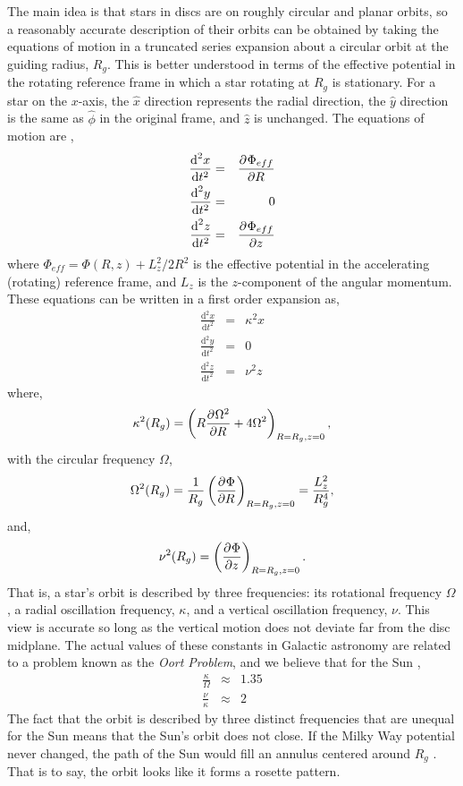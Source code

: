 The main idea is that stars in discs are on roughly circular and planar orbits, so a reasonably accurate description of their orbits can be obtained by taking the equations of motion in a truncated series expansion about a circular orbit at the guiding radius, $R_g$. This is better understood in terms of the effective potential in the rotating reference frame in which a star rotating at $R_g$ is stationary. For a star on the $x$-axis, the $\hat{x}$ direction represents the radial direction, the $\hat{y}$ direction is the same as $\hat{\phi}$ in the original frame, and $\hat{z}$ is unchanged. The equations of motion are \citep{BT},
\begin{eqnarray}
\frac{\text{d}^2x}{\text{d} t^2} &=& \frac{\partial^{} {\Phi_{eff}}}{\partial {R}^{}}\\
\frac{\text{d}^2y}{\text{d} t^2} &=& 0\\
\frac{\text{d}^2z}{\text{d} t^2} &=& \frac{\partial^{} {\Phi_{eff}}}{\partial {z}^{}}
\end{eqnarray}
where $\Phi_{eff} = \Phi(R,z) + L_z^2/2 R^2$ is the effective potential in the accelerating (rotating) reference frame, and $L_z$ is the $z$-component of the angular momentum. These equations can be written in a first order expansion as,
\begin{eqnarray}
\frac{\text{d}^2x}{\text{d} t^2} &=& \kappa^2 x\\
\frac{\text{d}^2y}{\text{d} t^2} &=& 0\\
\frac{\text{d}^2z}{\text{d} t^2} &=& \nu^2 z
\end{eqnarray}
where,
\begin{equation}
\kappa^2(R_g) = \left(R \frac{\partial^{} {\Omega^2}}{\partial {R}^{}} + 4 \Omega^2\right)_{R=R_g,z=0},
\end{equation}
with the circular frequency $\Omega$,
\begin{equation}
\Omega^2(R_g) = \frac{1}{R_g} \left(\frac{\partial^{} {\Phi}}{\partial {R}^{}}\right)_{R=R_g,z=0} = \frac{L_z^2}{R_g^4},
\end{equation}
and,
\begin{equation}
\nu^2(R_g) = \left(\frac{\partial^{} {\Phi}}{\partial {z}^{}}\right)_{R=R_g,z=0}.
\end{equation}
That is, a star's orbit is described by three frequencies: its rotational frequency $\Omega$, a radial oscillation frequency, $\kappa$, and a vertical oscillation frequency, $\nu$. This view is accurate so long as the vertical motion does not deviate far from the disc midplane. The actual values of these constants in Galactic astronomy are related to a problem known as the \textit{Oort Problem}, and we believe that for the Sun \citep{BT},
\begin{eqnarray}
\frac{\kappa}{\Omega} &\approx& 1.35 \\
\frac{\nu}{\kappa} &\approx& 2
\end{eqnarray} 
The fact that the orbit is described by three distinct frequencies that are unequal for the Sun means that the Sun's orbit does not close. If the Milky Way potential never changed, the path of the Sun would fill an annulus centered around $R_g$ \citep{BT}. That is to say, the orbit looks like it forms a rosette pattern.

